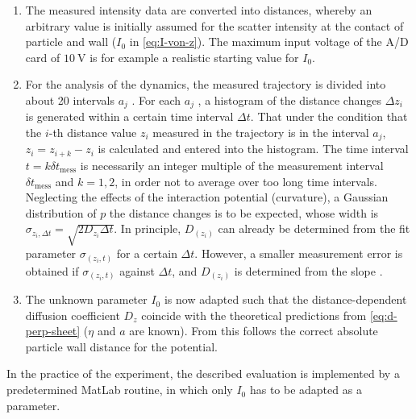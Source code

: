 \documentclass[.../bericht]{subfilies}
\begin{document}
      \begin{enumerate}
        \item The measured intensity data are converted into distances, whereby an arbitrary value is initially assumed for the scatter intensity at the contact of particle and wall ($I_0$ in \cref{eq:I-von-z}). The maximum input voltage of the A/D card of $\SI{10}{\volt}$ is for example a realistic starting value for $I_0$.
        \item For the analysis of the dynamics, the measured trajectory is divided into about 20 intervals $a_j$ . For each $a_j$ , a histogram of the distance changes $\Delta z_i$ is generated within a certain time interval $\Delta t$. That under the condition that the $i$-th distance value $z_i$ measured in the trajectory is in the interval $a_j$, $z_i = z_{i+k} - z_i$ is calculated and entered into the histogram. The time interval $t = k \delta t_\mathrm{mess}$ is necessarily an integer multiple of the measurement interval $\delta t_\mathrm{mess}$ and $k = 1,2$, in order not to average over too long time intervals. Neglecting the effects of the interaction potential (curvature), a Gaussian distribution of $p$ the distance changes is to be expected, whose width is $\sigma_{z_i ,\Delta t} = \sqrt{2D_{z_i} \Delta t}$. In principle, $D_{(z_i)}$ can already be determined from the fit parameter $\sigma_{(z_i,t)}$ for a certain $\Delta t$. However, a smaller measurement error is obtained if $\sigma_{(z_i ,t)}$ against $\Delta t$, and  $D_{(z_i)}$ is determined from the slope \cite{4}.
        \item The unknown parameter $I_0$ is now adapted such that the distance-dependent diffusion coefficient $D_z$ coincide with the theoretical predictions from \cref{eq:d-perp-sheet} ($\eta$ and $a$ are known). From this follows the correct absolute particle wall distance for the potential.
      \end{enumerate}
      In the practice of the experiment, the described evaluation is implemented by a predetermined MatLab routine, in which only $I_0$ has to be adapted as a parameter.
\end{document}
